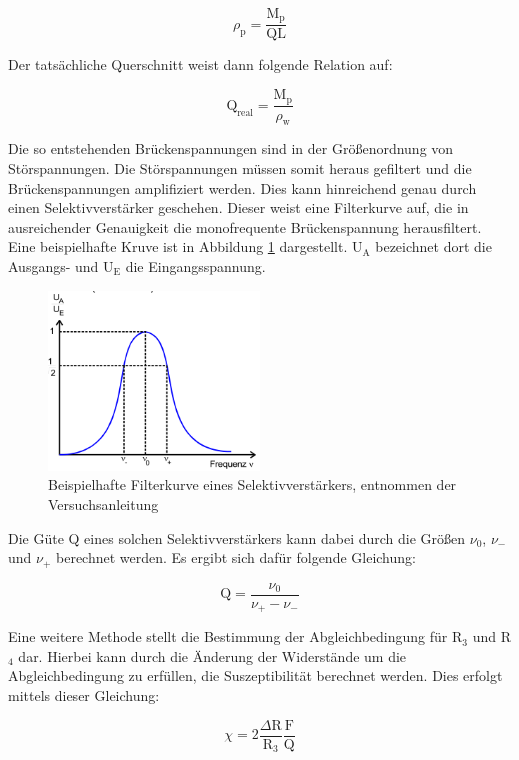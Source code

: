 \begin{equation}
  \rho_\text{p} = \frac{\text{M}_\text{p}}{\text{Q} \text{L}}
\end{equation}

Der tatsächliche Querschnitt weist dann folgende Relation auf:

\begin{equation}
  \text{Q}_\text{real} = \frac{\text{M}_\text{p}}{\rho_\text{w}}
  \label{eqn:qreal}
\end{equation}

Die so entstehenden Brückenspannungen sind in der Größenordnung von Störspannungen.
Die Störspannungen müssen somit heraus gefiltert und die Brückenspannungen amplifiziert werden.
Dies kann hinreichend genau durch einen Selektivverstärker geschehen.
Dieser weist eine Filterkurve auf, die in ausreichender Genauigkeit die monofrequente Brückenspannung herausfiltert.
Eine beispielhafte Kruve ist in Abbildung \ref{fig:theofilterkurve} dargestellt.
U$_\text{A}$ bezeichnet dort die Ausgangs- und U$_\text{E}$ die Eingangsspannung.

\begin{figure}
  \centering
  \includegraphics[width=0.5\textwidth]{images/theodiefilterkurve.png}
  \caption{Beispielhafte Filterkurve eines Selektivverstärkers, entnommen der Versuchsanleitung\cite[182]{sample}}
  \label{fig:theofilterkurve}
\end{figure}

Die Güte Q eines solchen Selektivverstärkers kann dabei durch die Größen $\nu_0$, $\nu_-$ und $\nu_+$ berechnet werden.
Es ergibt sich dafür folgende Gleichung:

\begin{equation}
  \text{Q} = \frac{\nu_0}{\nu_+ - \nu_-}
  \label{eqn:Güte}
\end{equation}

Eine weitere Methode stellt die Bestimmung der Abgleichbedingung für R$_3$ und R$_4$ dar.
Hierbei kann durch die Änderung der Widerstände um die Abgleichbedingung zu erfüllen, die Suszeptibilität berechnet werden.
Dies erfolgt mittels dieser Gleichung:

\begin{equation}
  \chi = 2 \frac{\Delta \text{R}}{\text{R}_3} \frac{\text{F}}{\text{Q}}
  \label{eqn:chi2}
\end{equation}
